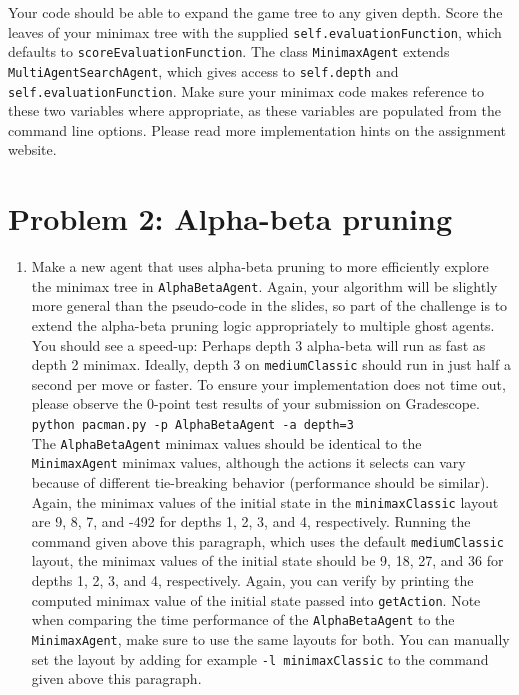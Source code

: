 \documentclass{article}
\theoremstyle{case}
\theoremstyle{definition}
\begin{document}
\begin{enumerate}
    Your code should be able to expand the game tree to any given depth. Score the leaves of your minimax tree with the supplied \texttt{self.evaluationFunction}, which defaults to \texttt{scoreEvaluationFunction}. The class \texttt{MinimaxAgent} extends \texttt{MultiAgentSearchAgent}, which gives access to \texttt{self.depth} and \texttt{self.evaluationFunction}. Make sure your minimax code makes reference to these two variables where appropriate, as these variables are populated from the command line options. Please read more implementation hints on the assignment website.
\end{enumerate}

\newpage
\section*{Problem 2: Alpha-beta pruning}
\begin{enumerate}
    \item[a.]
    [10 points] Make a new agent that uses alpha-beta pruning to more efficiently explore the minimax tree in \texttt{AlphaBetaAgent}. Again, your algorithm will be slightly more general than the pseudo-code in the slides, so part of the challenge is to extend the alpha-beta pruning logic appropriately to multiple ghost agents. \\

    You should see a speed-up: Perhaps depth 3 alpha-beta will run as fast as depth 2 minimax. Ideally, depth 3 on \texttt{mediumClassic} should run in just half a second per move or faster. To ensure your implementation does not time out, please observe the 0-point test results of your submission on Gradescope. \\

    \texttt{python pacman.py -p AlphaBetaAgent -a depth=3} \\

    The \texttt{AlphaBetaAgent} minimax values should be identical to the \texttt{MinimaxAgent} minimax values, although the actions it selects can vary because of different tie-breaking behavior (performance should be similar). Again, the minimax values of the initial state in the \texttt{minimaxClassic} layout are 9, 8, 7, and -492 for depths 1, 2, 3, and 4, respectively. Running the command given above this paragraph, which uses the default \texttt{mediumClassic} layout, the minimax values of the initial state should be 9, 18, 27, and 36 for depths 1, 2, 3, and 4, respectively. Again, you can verify by printing the computed minimax value of the initial state passed into \texttt{getAction}. Note when comparing the time performance of the \texttt{AlphaBetaAgent} to the \texttt{MinimaxAgent}, make sure to use the same layouts for both. You can manually set the layout by adding for example \texttt{-l minimaxClassic} to the command given above this paragraph.
\end{enumerate}
\end{document}
